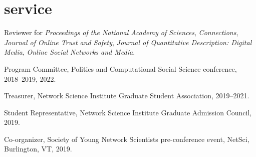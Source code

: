 \documentclass[11pt, letter]{article}
\begin{document}
 \section{service}
 Reviewer for \textit{Proceedings of the National Academy of Sciences}, \textit{Connections}, \textit{Journal of Online Trust and Safety}, \textit{Journal of Quantitative Description: Digital Media}, \textit{Online Social Networks and Media}.

 Program Committee, Politics and Computational Social Science conference, 2018--2019, 2022.

 Treasurer, Network Science Institute Graduate Student Association, 2019--2021.

 Student Representative, Network Science Institute Graduate Admission Council, 2019.

 Co-organizer, Society of Young Network Scientists pre-conference event, NetSci, Burlington, VT, 2019.
\end{document}
